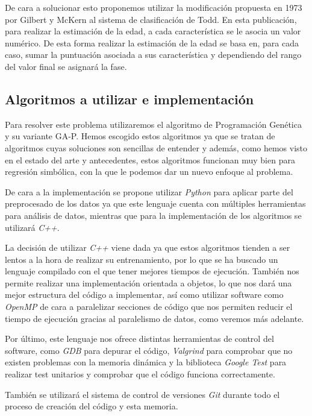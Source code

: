 De cara a solucionar esto proponemos utilizar la modificación propuesta en 1973 por Gilbert y McKern \cite{propuestaGilbert} al sistema de clasificación de Todd. En esta publicación, para realizar la estimación de la edad, a cada característica se le asocia un valor numérico. De esta forma realizar la estimación de la edad se basa en, para cada caso, sumar la puntuación asociada a sus característica y dependiendo del rango del valor final se asignará la fase.

\subsection{Algoritmos a utilizar e implementación}

Para resolver este problema utilizaremos el algoritmo de Programación Genética y su variante GA-P. Hemos escogido estos algoritmos ya que se tratan de algoritmos cuyas soluciones son sencillas de entender y además, como hemos visto en el estado del arte y antecedentes, estos algoritmos funcionan muy bien para regresión simbólica, con la que le podemos dar un nuevo enfoque al problema.

De cara a la implementación se propone utilizar \textit{Python} para aplicar parte del preprocesado de los datos ya que este lenguaje cuenta con múltiples herramientas para análisis de datos, mientras que para la implementación de los algoritmos se utilizará \textit{C++}.

La decisión de utilizar \textit{C++} viene dada ya que estos algoritmos tienden a ser lentos a la hora de realizar su entrenamiento, por lo que se ha buscado un lenguaje compilado con el que tener mejores tiempos de ejecución. También nos permite realizar una implementación orientada a objetos, lo que nos dará una mejor estructura del código a implementar, así como utilizar software como \textit{OpenMP} \cite{OpenMP} de cara a paralelizar secciones de código que nos permiten reducir el tiempo de ejecución gracias al paralelismo de datos, como veremos más adelante.

Por último, este lenguaje nos ofrece distintas herramientas de control del software, como \textit{GDB} \cite{gdb} para depurar el código, \textit{Valgrind} \cite{valgrind} para comprobar que no existen problemas con la memoria dinámica y la biblioteca \textit{Google Test} \cite{gtest} para realizar test unitarios y comprobar que el código funciona correctamente.

También se utilizará el sistema de control de versiones \textit{Git} \cite{git} durante todo el proceso de creación del código y esta memoria.

